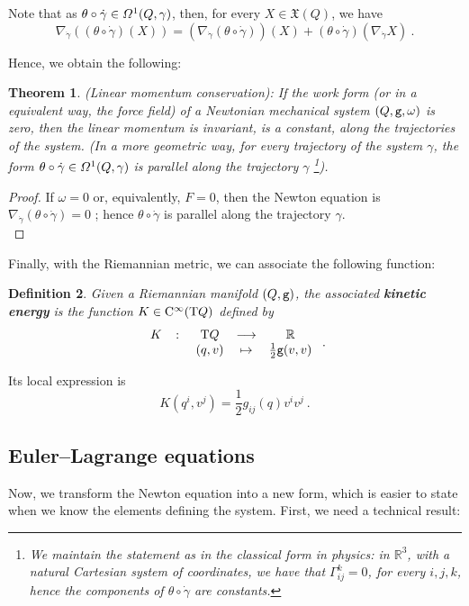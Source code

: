 \documentclass[12pt]{report}
\newtheorem{teor}{Theorem}[chapter]
\newtheorem{definition}[teor]{Definition}
\def\dst{\displaystyle}
\def\qed{\ifvmode\removelastskip\fi
{\unskip\nobreak\hfil\penalty50\hbox{}\nobreak\hfil
\hbox{\vrule height1.2ex width1.2ex}\parfillskip=0pt
\finalhyphendemerits=0 \par\smallskip}}
\def\vf{\mathfrak X}
\def\df{{\mit\Omega}}
\def\Real{\mathbb{R}}
\def\Tan{{\rm T}}
\def\Cinfty{{\rm C}^\infty}
\begin{document}
Note that as $\theta\circ\dot\gamma\in\df^1(Q,\gamma)$, then,
for every $X\in\vf(Q)$, we have
$$
\nabla_{\dot\gamma}((\theta\circ\dot\gamma)(X))=
(\nabla_{\dot\gamma}(\theta\circ\dot\gamma))(X)+
(\theta\circ\dot\gamma)(\nabla_{\dot\gamma}X) \ .
$$

Hence, we obtain the following:

\begin{teor}
{\rm (Linear momentum conservation)}:
If the work form (or in a equivalent way, the force field) of a Newtonian mechanical system $(Q,{\tt g},\omega)$ is zero, then the linear momentum is invariant, is a constant, along the trajectories of the system.
(In a more geometric way, for every trajectory of the system $\gamma$, the form 
$\theta\circ\dot\gamma\in\df^1(Q,\gamma)$ is parallel along the trajectory $\gamma$
\footnote{We maintain the statement as in the classical form in physics:
in $\Real^3$, with a natural Cartesian system of coordinates, we have that
$\Gamma^k_{ij}=0$, for every $ i,j,k$, hence the components of
$\theta\circ\dot\gamma$ are constants.
}).
\end{teor}
\begin{proof}
If
$\omega=0$ or, equivalently, $ F=0$, then the Newton equation is
\(\dst \nabla_{\dot\gamma}(\theta\circ\dot\gamma)=0\) ;
hence $\theta\circ\dot\gamma$ is parallel along the trajectory $\gamma$.
\\ \qed \end{proof}

Finally, with the Riemannian metric, we can associate the following function:

\begin{definition}
Given a Riemannian manifold $(Q,{\tt g})$,  the associated \textbf{kinetic energy} is the function
$K\in\Cinfty(\Tan Q)$ defined by
$$
\begin{array}{ccccc}
K & \colon & \Tan Q & \longrightarrow & \Real  \\
& & (q,v) &\mapsto & \frac{1}{2}{\tt g}(v,v)
\end{array} \ .
$$
\end{definition}

Its local expression is
$$
K(q^i,v^j)=\frac{1}{2}g_{ij}(q)v^iv^j \ .
$$


\subsection{Euler--Lagrange equations}


Now, we transform the Newton equation into a new form, 
which is easier to state when we know the elements defining the system.
First, we need a technical result:
\end{document}
